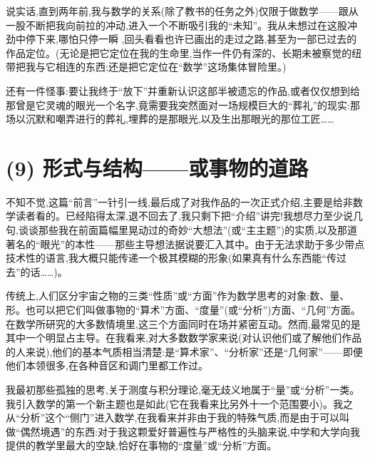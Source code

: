 说实话,直到两年前,我与数学的关系(除了教书的任务之外)仅限于做数学——跟从一股不断把我向前拉的冲动,进入一个不断吸引我的“未知”。我从未想过在这股冲劲中停下来,哪怕只停一瞬
,回头看看也许已画出的走过之路,甚至为一部已过去的作品定位。(无论是把它定位在我的生命里,当作一件仍有深的、长期未被察觉的纽带把我与它相连的东西;还是把它定位在“数学”这场集体冒险里。)

还有一件怪事:要让我终于“放下”并重新认识这部半被遗忘的作品,或者仅仅想到给那曾是它灵魂的眼光一个名字,竟需要我突然面对一场规模巨大的“葬礼”的现实:那场以沉默和嘲弄进行的葬礼,埋葬的是那眼光,以及生出那眼光的那位工匠……

\section{(9) 形式与结构——或事物的道路}

不知不觉,这篇“前言”一针引一线,最后成了对我作品的一次正式介绍,主要是给非数学读者看的。已经陷得太深,退不回去了,我只剩下把“介绍”讲完!我想尽力至少说几句,谈谈那些我在前面篇幅里晃动过的奇妙“大想法”(或“主主题”)的实质,以及那道著名的“眼光”的本性——那些主导想法据说要汇入其中。由于无法求助于多少带点技术性的语言,我大概只能传递一个极其模糊的形象(如果真有什么东西能“传过去”的话……)。

传统上,人们区分宇宙之物的三类“性质”或“方面”作为数学思考的对象:数、量、形。也可以把它们叫做事物的“算术”方面、“度量”(或“分析”)方面、“几何”方面。在数学所研究的大多数情境里,这三个方面同时在场并紧密互动。然而,最常见的是其中一个明显占主导。在我看来,对大多数数学家来说(对认识他们或了解他们作品的人来说),他们的基本气质相当清楚:是“算术家”、“分析家”还是“几何家”——即便他们本领很多,在各种音区和调门里都工作过。

我最初那些孤独的思考,关于测度与积分理论,毫无歧义地属于“量”或“分析”一类。我引入数学的第一个新主题也是如此(它在我看来比另外十一个范围要小)。我之从“分析”这个“侧门”进入数学,在我看来并非由于我的特殊气质,而是由于可以叫做“偶然境遇”的东西:对于我这颗爱好普遍性与严格性的头脑来说,中学和大学向我提供的教学里最大的空缺,恰好在事物的“度量”或“分析”方面。

